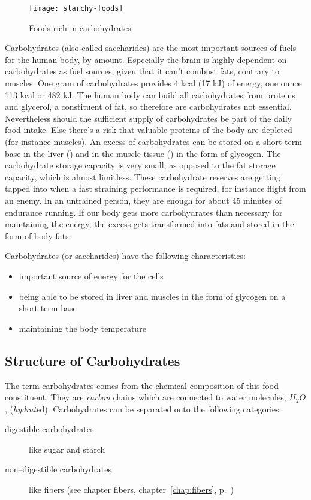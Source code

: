 \documentclass[../main.tex]{subfiles}
\begin{document}
\begin{figure}[htb!]
\centering
  \texttt{[image: starchy-foods]}
  \caption{Foods rich in carbohydrates~\cite{PicCarbohydrates}}
\end{figure}


Carbohydrates (also called saccharides) are the most important sources of fuels for the human body, by amount.
Especially the brain is highly dependent on carbohydrates as fuel sources, given that it can't combust fats, contrary to muscles.
One gram of carbohydrates provides 4 kcal (17 kJ) of energy, one ounce 113 kcal or 482 kJ.
The human body can build all carbohydrates from proteins and glycerol, a constituent of fat, so therefore are carbohydrates not essential.
Nevertheless should the sufficient supply of carbohydrates be part of the daily food intake.
Else there's a risk that valuable proteins of the body are depleted (for instance muscles).
An excess of carbohydrates can be stored on a short term base in the liver () and in the muscle tissue () in the form of glycogen.
The carbohydrate storage capacity is very small, as opposed to the fat storage capacity, which is almost limitless.
These carbohydrate reserves are getting tapped into when a fast straining performance is required, for instance flight from an enemy.
In an untrained person, they are enough for about 45 minutes of endurance running.
If our body gets more carbohydrates than necessary for maintaining the energy, the excess gets transformed into fats and stored in the form of body fats.

Carbohydrates (or saccharides) have the following characteristics:
\begin{itemize}
\item important source of energy for the cells
\item being able to be stored in liver and muscles in the form of glycogen on a short term base
\item maintaining the body temperature
\end{itemize}

\subsection{Structure of Carbohydrates}

The term carbohydrates comes from the chemical composition of this food constituent.
They are \emph{carbon} chains which are connected to water molecules, $H_2O$, (\emph{hydrate}d).
Carbohydrates can be separated onto the following categories:
\begin{description}
\item[digestible carbohydrates] like sugar and starch
\item[non--digestible carbohydrates] like fibers (see chapter fibers, chapter~\ref{chap:fibers}, p.~\pageref{chap:fibers})
\end{description}
\end{document}
